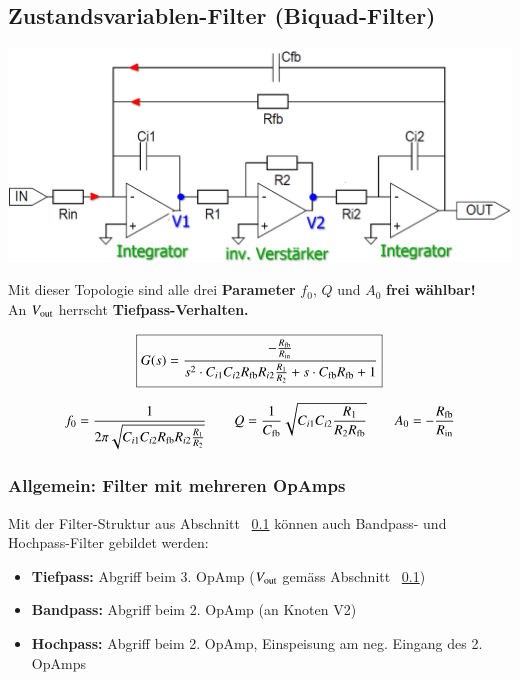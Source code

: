 
\subsection{Zustandsvariablen-Filter (Biquad-Filter)}
\label{zustandsvariablenfilter}

\begin{minipage}[c]{0.6\columnwidth}
    \includegraphics[width=\columnwidth]{images/zustandsvariablenfilter.png}
\end{minipage}
\hfill
\begin{minipage}[c]{0.38\columnwidth}
    \raggedright%
    Mit dieser Topologie sind alle drei \textbf{Parameter} $f_0$, $Q$ und $A_0$ \textbf{frei wählbar!} \\
    An $V_{\rm out}$ herrscht \textbf{Tiefpass-Verhalten.}
\end{minipage}

$$ \boxed{ G(s) = \frac{- \frac{R_{\rm fb}}{R_{\rm in}}}{s^2 \cdot C_{i1} C_{i2} R_{\rm fb} R_{i2} \frac{R_1}{R_2} + s \cdot C_{\rm fb} R_{\rm fb} + 1} } $$

$$ f_0 = \frac{1}{2 \pi \sqrt{C_{i1} C_{i2} R_{\rm fb} R_{i2} \frac{R_1}{R_2}}} \qquad Q = \frac{1}{C_{\rm fb}} \sqrt{C_{i1} C_{i2} \frac{R_1}{R_2 R_{\rm fb}} } 
\qquad A_0 = - \frac{R_{\rm fb}}{R_{\rm in}} $$


\subsubsection{Allgemein: Filter mit mehreren OpAmps}
Mit der Filter-Struktur aus Abschnitt ~\ref{zustandsvariablenfilter} können auch Bandpass- und Hochpass-Filter gebildet werden:
\begin{itemize}
    \item \textbf{Tiefpass:} Abgriff beim 3. OpAmp ($V_{\rm out}$ gemäss Abschnitt ~\ref{zustandsvariablenfilter})
    \item \textbf{Bandpass:} Abgriff beim 2. OpAmp (an Knoten V2)
    \item \textbf{Hochpass:} Abgriff beim 2. OpAmp, Einspeisung am neg. Eingang des 2. OpAmps 
\end{itemize}


